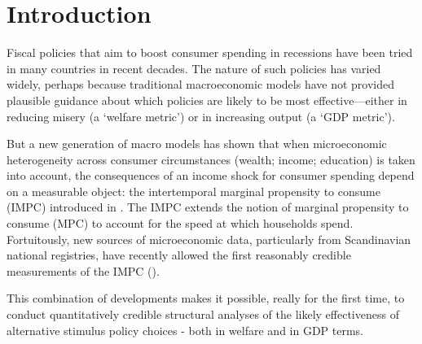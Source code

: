\documentclass[\econtexRoot/HAFiscal]{subfiles}
\begin{document}
\hypertarget{introduction}{}\par\section{Introduction}\notinsubfile{\label{sec:intro}}
\setcounter{page}{0}

Fiscal policies that aim to boost consumer spending in recessions have been tried in many countries in recent decades.  The nature of such policies has varied widely, perhaps because traditional macroeconomic models have not provided plausible guidance about which policies are likely to be most effective---either in reducing misery (a `welfare metric') or in increasing output (a `GDP metric').

But a new generation of macro models has shown that when microeconomic heterogeneity across consumer circumstances (wealth; income; education) is taken into account, the consequences of an income shock for consumer spending depend on a measurable object: the intertemporal marginal propensity to consume (IMPC) introduced in \cite{auclert2018IKC}.  The IMPC extends the notion of marginal propensity to consume (MPC) to account for the speed at which households spend.  Fortuitously, new sources of microeconomic data, particularly from Scandinavian national registries, have recently allowed the first reasonably credible measurements of the IMPC (\cite{fagereng_mpc_2021}).

This combination of developments makes it possible, really for the first time, to conduct quantitatively credible structural analyses of the likely effectiveness of alternative stimulus policy choices - both in welfare and in GDP terms.
\end{document}
